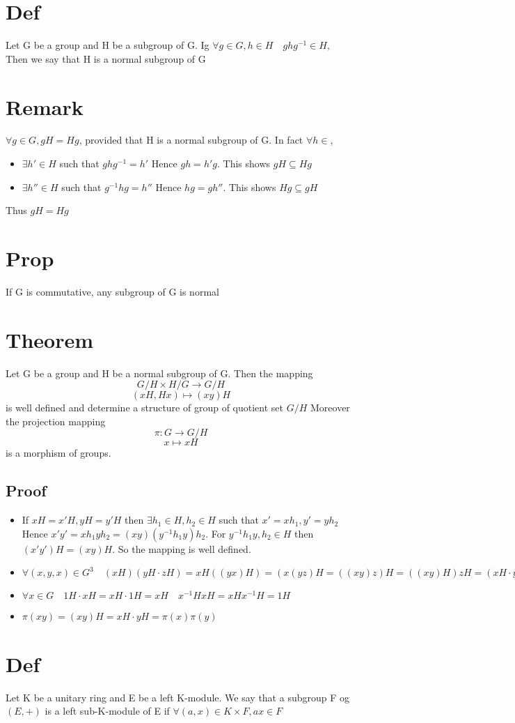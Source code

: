 \documentclass{book}
\begin{document}
\section{Def}
Let G be a group and H be a subgroup of G. Ig $\forall g\in G,h\in H\quad ghg^{-1}\in H,$ Then we say that H is a normal subgroup of G
\section{Remark}
$\forall g\in G, gH=Hg$, provided that H is a normal subgroup of G. In fact $\forall h\in $,\begin{itemize}
    \item $\exists h'\in H$ such that $ghg^{-1}=h'$ Hence $gh=h'g$. This shows $gH\subseteq Hg$
    \item $\exists h''\in H$ such that $g^{-1}hg=h''$ Hence $hg=gh''$. This shows $Hg\subseteq gH$
\end{itemize}
Thus $gH=Hg$
\section{Prop}
If G is commutative, any subgroup of G is normal
\section{Theorem}
Let G be a group and H be a normal subgroup of G. Then the mapping $$G/ H\times H/ G\rightarrow G/ H$$$$(xH,Hx)\mapsto(xy)H$$
is well defined and determine a structure of group of quotient set $G/ H$ Moreover the projection mapping $$\pi:G\rightarrow G/ H$$$$ x\mapsto xH$$ is a morphism of groups.
\subsection*{Proof}
\begin{itemize}
    \item If $xH=x'H,yH=y'H$ then $\exists h_1\in H,h_2\in H$ such that $x'=xh_1,y'=yh_2$ Hence $x'y'=xh_1yh_2=(xy)(y^{-1}h_1y)h_2$. For $y^{-1}h_1y,h_2\in H$ then $(x'y')H=(xy)H.$ So the mapping is well defined.
    \item $\forall (x,y,x)\in G^3\quad (xH)(yH\cdot zH)=xH((yx)H)=(x(yz)H=((xy)z)H=((xy)H)zH=(xH\cdot yH)zH)$
    \item $\forall x\in G\quad 1H\cdot xH=xH\cdot 1H=xH\quad x^{-1}HxH=xHx^{-1}H=1H$
    \item $\pi(xy)=(xy)H=xH\cdot yH=\pi(x)\pi(y)$
\end{itemize}
\section{Def}
Let K be a unitary ring and E be a left K-module. We say that a subgroup F og $(E,+)$ is a left sub-K-module of E if $\forall(a,x)\in K\times F, ax\in F$
\end{document}
